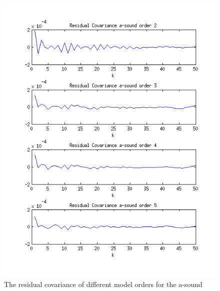 \documentclass[12pt]{article}
\begin{document}
\begin{figure}[H]
\centering
\includegraphics[width=14cm]{residual_covariance_a.png}
\caption{The residual covariance of different model orders for the a-sound}
\end{figure}
\end{document}
